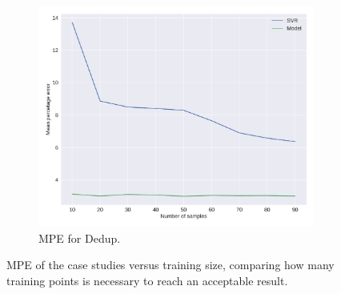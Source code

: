 \begin{figure}[H]
\begin{subfigure}[b]{0.45\textwidth}
		\centerline{\includegraphics[width=\columnwidth]{models/figures/overhead/completo_dedup_4.pdf}}
		\caption{MPE for Dedup.}
		\label{fig:overhead_dedup}
	\end{subfigure}
	
	\caption{MPE of the case studies versus training size, comparing how many training points is necessary to reach an acceptable result.}
	\label{fig:overheadapps}
\end{figure}

